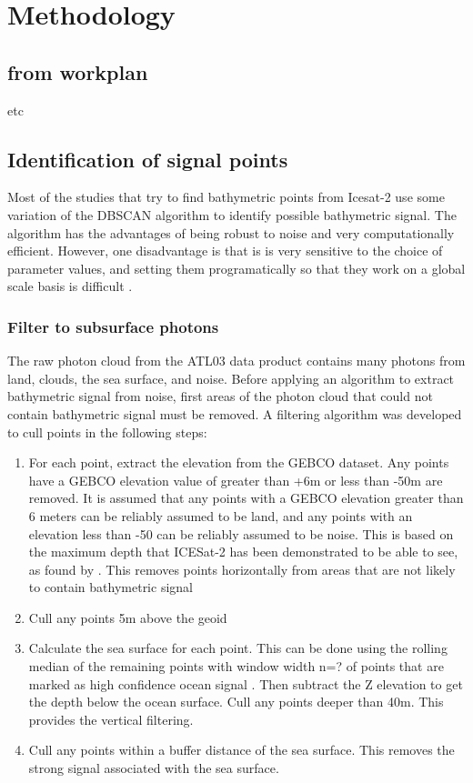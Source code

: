 \chapter{Methodology}

\section*{from workplan}
etc

\section{Identification of signal points}
Most of the studies that try to find bathymetric points from Icesat-2 use some variation of the DBSCAN algorithm to identify possible bathymetric signal. The algorithm has the advantages of being robust to noise \cite{} and very computationally efficient. However, one disadvantage is that is is very sensitive to the choice of parameter values, and setting them programatically so that they work on a global scale basis is difficult \cite{}.

\subsection{Filter to subsurface photons}
The raw photon cloud from the ATL03 data product contains many photons from land, clouds, the sea surface, and noise. Before applying an algorithm to extract bathymetric signal from noise, first areas of the photon cloud that could not contain bathymetric signal must be removed. A filtering algorithm was developed to cull points in the following steps:

\begin{enumerate}
    \item For each point, extract the elevation from the GEBCO dataset. Any points have a GEBCO elevation value of greater than +6m or less than -50m are removed. It is assumed that any points with a GEBCO elevation greater than 6 meters can be reliably assumed to be land, and any points with an elevation less than -50 can be reliably assumed to be noise. This is based on the maximum depth that ICESat-2 has been demonstrated to be able to see, as found by \cite{Parrish2019}. This removes points horizontally from areas that are not likely to contain bathymetric signal
    
    \item Cull any points 5m above the geoid

    \item Calculate the sea surface for each point. This can be done using the rolling median of the remaining points with window width n=? of points that are marked as high confidence ocean signal \parencite{Ranndal2021}. Then subtract the Z elevation to get the depth below the ocean surface.  Cull any points deeper than 40m. This provides the vertical filtering. 
    \item Cull any points within a buffer distance of the sea surface. This removes the strong signal associated with the sea surface.
\end{enumerate}

